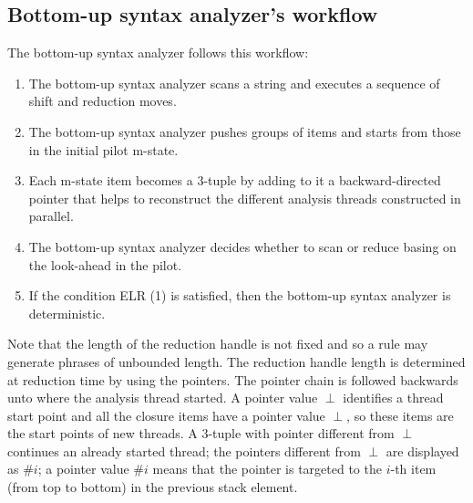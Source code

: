 \subsection*{Bottom-up syntax analyzer's workflow}
The bottom-up syntax analyzer follows this workflow: 
\begin{enumerate}
    \item The bottom-up syntax analyzer scans a string and executes a sequence of shift and reduction moves.
    \item The bottom-up syntax analyzer pushes groups of items and starts from those in the initial pilot m-state.
    \item Each m-state item becomes a 3-tuple by adding to it a backward-directed pointer that helps to reconstruct the different analysis threads constructed in parallel.
    \item The bottom-up syntax analyzer decides whether to scan or reduce basing on the look-ahead in the pilot.
    \item If the condition ELR (1) is satisfied, then the bottom-up syntax analyzer is deterministic. 
\end{enumerate}
Note that the length of the reduction handle is not fixed and so a rule  may generate phrases of unbounded length. 
The reduction handle length is determined at reduction time by using the pointers.
The pointer chain is followed backwards unto where the analysis thread started.
A pointer value $\perp$ identifies a thread start point and all the closure items have a pointer value $\perp$, so these items are the start points of new threads. 
A 3-tuple with pointer different from $\perp$ continues an already started thread; the pointers different from $\perp$ are displayed as $\#i$; a pointer value $\#i$ means that the pointer is targeted to the $i$-th item (from top to bottom) in the previous stack element. 

